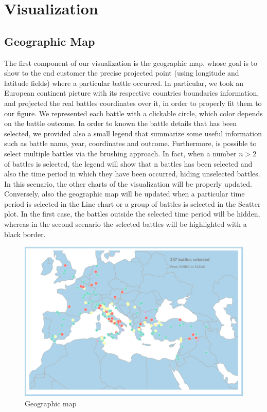 \section{Visualization}
\subsection{Geographic Map}
The first component of our visualization is the geographic map, whose goal is to show to the end customer the precise projected point (using longitude and latitude fields) where a particular battle occurred. In particular, we took an European continent picture with its respective countries boundaries information, and projected the real battles coordinates over it, in order to properly fit them to our figure. We represented each battle with a clickable circle, which color depends on the battle outcome. In order to known the battle details that has been selected, we provided also a small legend that summarize some useful information such as battle name, year, coordinates and outcome. Furthermore, is possible to select multiple battles via the brushing approach. In fact, when a number $n > 2$ of battles is selected, the legend will show that n battles has been selected and also the time period in which they have been occurred, hiding unselected battles. In this scenario, the other charts of the visualization will be properly updated. Conversely, also the geographic map will be updated when a particular time period is selected in the Line chart or a group of battles is selected in the Scatter plot. In the first case, the battles outside the selected time period will be hidden, whereas in the second scenario the selected battles will be highlighted with a black border.
\begin{figure}[h]
\centering
\includegraphics[scale=0.20]{./images/geographic_map.png}
\caption{Geographic map}
\end{figure}

